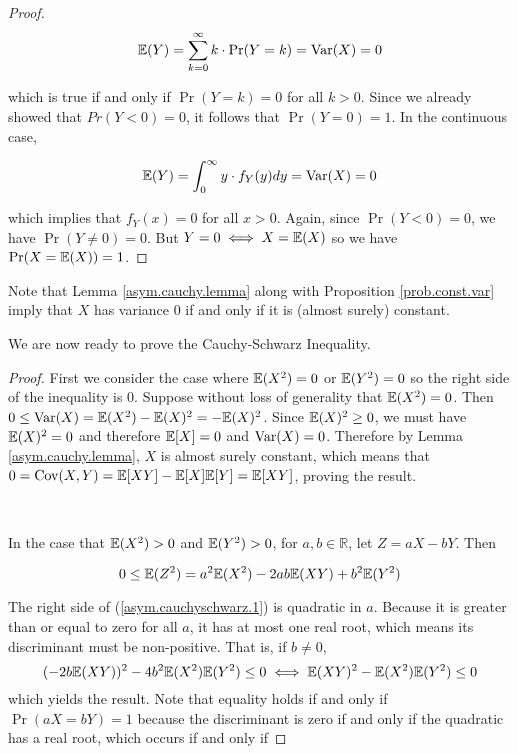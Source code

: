 \begin{itemize}
\begin{itemize}
\begin{proof}
\[
\mathbb{E}(Y) = \sum_{k=0}^\infty k \cdot \Pr(Y=k) = \mathrm{Var}(X) = 0 
\]

which is true if and only if \(\Pr(Y=k) = 0\) for all \(k > 0\). Since we already showed that \(Pr(Y < 0) = 0\), it follows that \(\Pr(Y=0) = 1\). In the continuous case,

\[
\mathbb{E}(Y) = \int_{0}^\infty y \cdot f_Y(y) dy = \mathrm{Var}(X) = 0 
\]

which implies that \(f_Y(x) = 0\) for all \(x > 0\). Again, since \(\Pr(Y < 0) = 0\), we have \(\Pr(Y \neq 0) = 0\). But \(Y = 0 \iff X = \mathbb{E}(X)\) so we have \(\Pr(X = \mathbb{E}(X)) = 1\).
\end{proof}

\begin{remark}Note that Lemma \ref{asym.cauchy.lemma} along with Proposition \ref{prob.const.var} imply that \(X\) has variance 0 if and only if it is (almost surely) constant.
\end{remark}

We are now ready to prove the Cauchy-Schwarz Inequality.

\begin{proof} First we consider the case where \(\mathbb{E}(X^2) = 0\) or \(\mathbb{E}(Y^2)=0\) so the right side of the inequality is 0. Suppose without loss of generality that \(\mathbb{E}(X^2) = 0\). Then \(0 \leq \mathrm{Var}(X) = \mathbb{E}(X^2) - \mathbb{E}(X)^2 = - \mathbb{E}(X)^2\). Since \(\mathbb{E}(X)^2 \geq 0\), we must have \(\mathbb{E}(X)^2 =0\) and therefore \(\mathbb{E}[X] = 0\) and \(\mathrm{Var}(X) = 0\). Therefore by Lemma \ref{asym.cauchy.lemma}, \(X\) is almost surely constant, which means that \(0 = \mathrm{Cov}(X,Y) = \mathbb{E}[XY] - \mathbb{E}[X] \mathbb{E}[Y] = \mathbb{E}[XY] \), proving the result.

\

 In the case that \(\mathbb{E}(X^2) > 0\) and \(\mathbb{E}(Y^2) > 0\), for \(a, b \in \mathbb{R}\), let \(Z = aX - bY\). Then 

\begin{equation}\label{asym.cauchyschwarz.1}
0 \leq \mathbb{E}(Z^2) = a^2 \mathbb{E}(X^2) - 2ab \mathbb{E}(XY) + b^2 \mathbb{E}(Y^2)
\end{equation}

The right side of (\ref{asym.cauchyschwarz.1}) is quadratic in \(a\). Because it is greater than or equal to zero for all \(a\), it has at most one real root, which means its discriminant must be non-positive. That is, if \(b \neq 0\),
\[
(-2b \mathbb{E}(XY))^2 - 4 b^2\mathbb{E}(X^2)\mathbb{E}(Y^2) \leq 0 \iff \mathbb{E}(XY)^2 - \mathbb{E}(X^2)\mathbb{E}(Y^2) \leq 0
\]
which yields the result. Note that equality holds if and only if \(\Pr(aX = bY) = 1\) because the discriminant is zero if and only if the quadratic has a real root, which occurs if and only if 


\end{proof}
\end{itemize}
\end{itemize}
